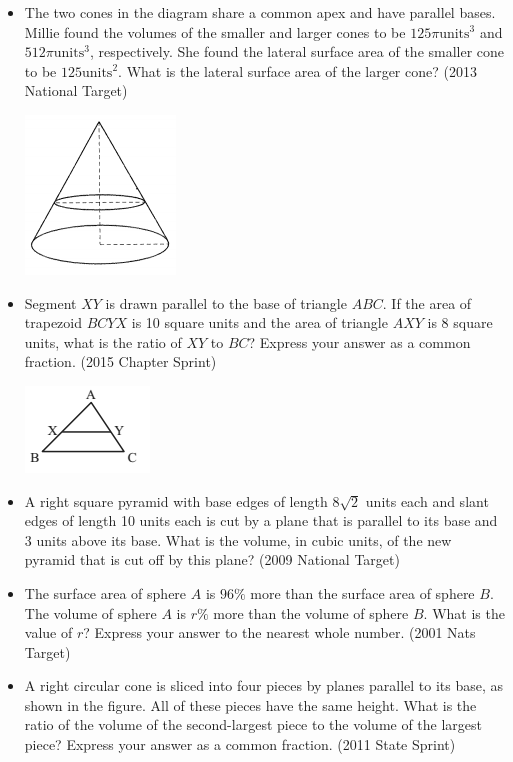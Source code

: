 \documentclass{article}
\begin{document}
\begin{itemize}
\item The two cones in the diagram share a common apex and have parallel bases. Millie found the volumes of the smaller and larger cones to be $125\pi \text{units}^3$ and $512\pi \text{units}^3$, respectively. She found the lateral surface area of the smaller cone to be $125 \text{units}^2$. What is the lateral surface area of the larger cone? (2013 National Target)

\centerline{\includegraphics{20132.png}}

\item Segment $XY$ is drawn parallel to the base of triangle $ABC$. If the area of trapezoid $BCYX$ is 10 square units and the area of triangle $AXY$ is 8 square units, what is the ratio of $XY$ to $BC$? Express your answer as a common fraction. (2015 Chapter Sprint)

\includegraphics{201520.png}

\item A right square pyramid with base edges of length $8\sqrt{2}$ units each and slant edges of length 10 units each is cut by a plane that is parallel to its base and 3 units above its base. What is the volume, in cubic units, of the new pyramid that is cut off by this plane? (2009 National Target)

\item The surface area of sphere $A$ is $96\%$ more than the surface area of sphere $B$. The volume of sphere $A$ is $r\%$ more than the volume of sphere $B$. What is the value of $r$? Express your answer to the nearest whole number. (2001 Nats Target)

\item A right circular cone is sliced into four pieces by planes parallel to its base, as shown in the figure. All of these pieces have the same height. What is the ratio of the volume of the second-largest piece to the volume of the largest piece? Express your answer as a common fraction. (2011 State Sprint)


\end{itemize}
\end{document}
